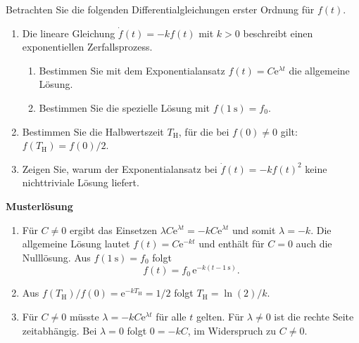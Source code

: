 \begin{ExerciseBlock}
Betrachten Sie die folgenden Differentialgleichungen erster Ordnung für $f(t)$.
\begin{enumerate}
\item Die lineare Gleichung $\dot f(t)=-kf(t)$ mit $k>0$ beschreibt einen exponentiellen Zerfallsprozess.
\begin{enumerate}
\item Bestimmen Sie mit dem Exponentialansatz $f(t)=C\mathrm e^{\lambda t}$ die allgemeine Lösung.
\item Bestimmen Sie die spezielle Lösung mit $f(\qty{1}{\second})=f_0$.
\end{enumerate}
\item Bestimmen Sie die Halbwertszeit $T_\mathrm H$, für die bei $f(0)\neq0$ gilt: $f(T_\mathrm H)=f(0)/2$.
\item Zeigen Sie, warum der Exponentialansatz bei $\dot f(t)=-kf(t)^2$ keine nichttriviale Lösung liefert.
\end{enumerate}
\end{ExerciseBlock}
\begin{Solution}
\par\medskip\noindent\textbf{Musterlösung}\par\nopagebreak[4]
\begin{enumerate}
\item Für $C\neq0$ ergibt das Einsetzen $\lambda C\mathrm e^{\lambda t}=-kC\mathrm e^{\lambda t}$ und somit $\lambda=-k$. Die allgemeine Lösung lautet $f(t)=C\mathrm e^{-kt}$ und enthält für $C=0$ auch die Nulllösung. Aus $f(\qty{1}{\second})=f_0$ folgt
\[
 f(t)=f_0\,\mathrm e^{-k(t-\qty{1}{\second})}.
\]
\item Aus $f(T_\mathrm H)/f(0)=\mathrm e^{-kT_\mathrm H}=1/2$ folgt $T_\mathrm H=\ln(2)/k$.
\item Für $C\neq0$ müsste $\lambda=-kC\mathrm e^{\lambda t}$ für alle $t$ gelten. Für $\lambda\ne0$ ist die rechte Seite zeitabhängig. Bei $\lambda=0$ folgt $0=-kC$, im Widerspruch zu $C\ne0$.
\end{enumerate}
\end{Solution}
